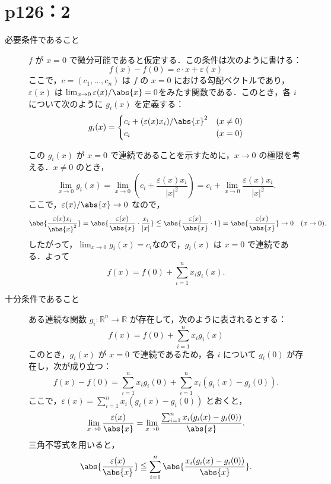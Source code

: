 \section*{p126：2}


\begin{tproof}
    \begin{description}
        \item[必要条件であること]
              $ f $ が $ x=0 $ で微分可能であると仮定する．この条件は次のように書ける：
              \[
                  f(x) - f(0) = c \cdot x + \varepsilon(x)
              \]
              ここで，$ c = (c_1, \ldots, c_n) $ は $ f $ の $ x=0 $ における勾配ベクトルであり，$ \varepsilon(x) $ は
              $\lim_{x \to 0} \varepsilon(x)/\abs{x} = 0$をみたす関数である．このとき，各 $ i $ について次のように $ g_i(x) $ を定義する：
              \[
                  g_i(x) =
                  \begin{cases}
                      c_i + (\varepsilon(x) x_i)/\abs{x}^2 & (x \ne 0) \\
                      c_i                                  & (x = 0)
                  \end{cases}
              \]

              この $ g_i(x) $ が $ x=0 $ で連続であることを示すために，$ x \to 0 $ の極限を考える．$ x \ne 0 $ のとき，
              \[
                  \lim_{x \to 0} g_i(x) = \lim_{x \to 0} \left( c_i + \frac{\varepsilon(x) x_i}{|x|^2} \right) = c_i + \lim_{x \to 0} \frac{\varepsilon(x) x_i}{|x|^2}.
              \]
              ここで，$\varepsilon(x)/\abs{x} \to 0 $ なので，
              \[
                  \abs{\frac{\varepsilon(x) x_i}{\abs{x}^2}} = \abs{\frac{\varepsilon(x)}{\abs{x}} \cdot \frac{x_i}{|x|}} \leqq  \abs{\frac{\varepsilon(x)}{\abs{x}} \cdot 1} = \abs{\frac{\varepsilon(x)}{\abs{x}}} \to 0 \quad (x \to 0).
              \]
              したがって，$\lim_{x \to 0} g_i(x) = c_i$なので，$ g_i(x) $ は $ x=0 $ で連続である．よって
              \[
                  f(x) = f(0) + \sum_{i=1}^n x_i g_i(x).
              \]
        \item [十分条件であること]
              ある連続な関数 $ g_i \colon \mathbb{R}^n \to \mathbb{R} $ が存在して，次のように表されるとする：
              \[
                  f(x) = f(0) + \sum_{i=1}^n x_i g_i(x)
              \]
              このとき，$ g_i(x) $ が $ x=0 $ で連続であるため，各 $ i $ について $ g_i(0) $ が存在し，次が成り立つ：
              \[
                  f(x) - f(0) = \sum_{i=1}^n x_i g_i(0) + \sum_{i=1}^n x_i (g_i(x) - g_i(0)).
              \]
              ここで，$ \varepsilon(x) = \sum_{i=1}^n x_i (g_i(x) - g_i(0)) $ とおくと，
              \[
                  \lim_{x \to 0} \frac{\varepsilon(x)}{\abs{x}} = \lim_{x \to 0} \frac{\sum_{i=1}^n x_i (g_i(x) - g_i(0))}{\abs{x}}.
              \]
              三角不等式を用いると，
              \[
                  \abs{ \frac{\varepsilon(x)}{\abs{x}} } \leqq \sum_{i=1}^n \abs{ \frac{x_i(g_i(x) - g_i(0))}{\abs{x}} }.
              \]


\end{description}
\end{tproof}
